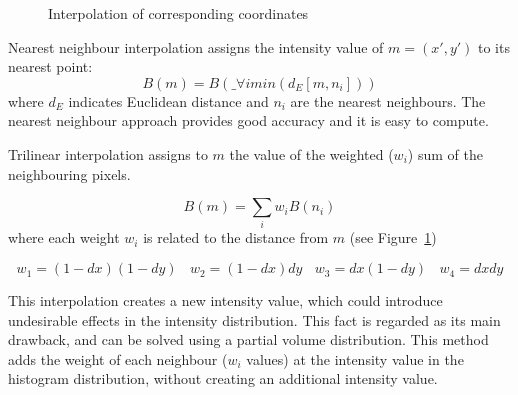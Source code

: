 \begin{figure}[htb]
        \centering
        \epsfxsize=4cm
        {}
  \caption{Interpolation of corresponding coordinates}
  \label{fig:interp}
\end{figure}

Nearest neighbour interpolation assigns the intensity value of
$m=(x',y')$ to its nearest point:
\begin{equation}
        B(m)=B(\_{\forall i}{min}(d_E[m,n_i]))
\end{equation}
\noindent where $d_E$ indicates Euclidean distance and $n_i$ are
the nearest neighbours. The nearest neighbour approach provides
good accuracy and it is easy to compute.

Trilinear interpolation assigns to $m$ the value of the weighted
($w_i$) sum of the neighbouring pixels.

\begin{equation}
        B(m)=\sum_iw_i B(n_i)
\end{equation}
\noindent where each weight $w_i$ is related to the distance from
$m$ (see Figure~\ref{fig:interp})

\begin{equation}
        w_1 = (1-dx)(1-dy) ~~~~ w_2 = (1-dx)dy ~~~~w_3 = dx(1-dy)
        ~~~~ w_4 = dx dy
        \nonumber
\end{equation}

This interpolation creates a new intensity value, which could
introduce undesirable effects in the intensity distribution. This
fact is regarded as its main drawback, and can be solved using a
partial volume distribution. This method adds the weight of each
neighbour ($w_i$ values) at the intensity value in the histogram
distribution, without creating an additional intensity value.